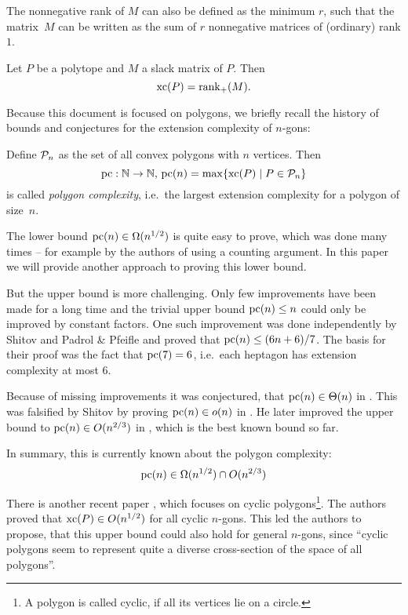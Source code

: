 The nonnegative rank of $M$ can also be defined as the minimum $r$, such that the matrix~$M$ can be written as the sum of $r$ nonnegative matrices of (ordinary) rank $1$.

\begin{theorem}
  Let $P$ be a polytope and $M$ a slack matrix of $P$. Then $$\xc(P) = \rank_+(M) .$$
\end{theorem}

Because this document is focused on polygons, we briefly recall the history of bounds and conjectures for the extension complexity of $n$-gons:

Define $\P_n$ as the set of all convex polygons with $n$ vertices. Then $$\pc:\N \to \N,\,\pc(n) = \max \{\xc(P) \mid P \in \P_n\}$$ is called \emph{polygon complexity}, i.e.\ the largest extension complexity for a polygon of size~$n$.

The lower bound $\pc(n) \in \Omega(n^{1/2})$ is quite easy to prove, which was done many times -- for example by the authors of \cite{fiorini2012extended} using a counting argument. In this paper we will provide another approach to proving this lower bound.

But the upper bound is more challenging. Only few improvements have been made for a long time and the trivial upper bound $\pc(n) \leq n$ could only be improved by constant factors. One such improvement was done independently by Shitov \cite{shitov2014upper} and Padrol \& Pfeifle \cite{padrol2014polygons} and proved that $\pc(n) \leq (6n+6)/7$. The basis for their proof was the fact that $\pc(7)=6$, i.e.\ each heptagon has extension complexity at most 6.

Because of missing improvements it was conjectured, that $\pc(n) \in \Theta(n)$ in \cite{fiorini2012extended}. This was falsified by Shitov by proving $\pc(n) \in o(n)$ in \cite{shitov2014sublinear}. He later improved the upper bound to $\pc(n) \in O(n^{2/3})$ in \cite{shitov2020sublinear}, which is the best known bound so far.

In summary, this is currently known about the polygon complexity:
$$\pc(n) \in \Omega(n^{1/2}) \cap O(n^{2/3})$$

There is another recent paper \cite{kwan2020extension}, which focuses on cyclic polygons\footnote{A polygon is called cyclic, if all its vertices lie on a circle.}. The authors proved that $\xc(P) \in O(n^{1/2})$ for all cyclic $n$-gons.
This led the authors to propose, that this upper bound could also hold for general $n$-gons, since ``cyclic polygons seem to represent quite a diverse cross-section of the space of all polygons''.




